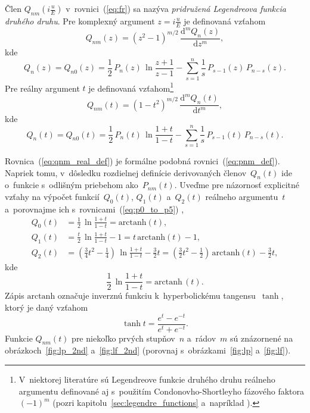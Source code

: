 \documentclass[a4paper, 12pt]{book}
\newcommand{\diff}{\mathrm d}
\begin{document}
Člen $Q_{nm}\left( i \frac{u}{E} \right)$ v~rovnici~(\ref{eq:fr}) sa nazýva 
\emph{pridružená Legendreova funkcia druhého druhu}.  Pre komplexný argument $z 
= i \frac{u}{E}$ je definovaná vzťahom \parencite{MoritzTheFigureOfTheEarth}
%
\begin{equation}
\label{eq:qnm_imag_def}
Q_{nm}(z) = (z^2 - 1)^{m \slash 2} \, \frac{\diff^m Q_n(z)}{\diff z^m}{,}
\end{equation}
%
kde
%
\begin{equation}
\label{eq:qn0_imag_def}
Q_{n}(z) = Q_{n0}(z) = \frac{1}{2} \, P_n(z) \, \ln\frac{z + 1}{z - 1} 
- \sum_{s = 1}^n \frac{1}{s} \, P_{s - 1}(z) \, P_{n - s}(z){.}
\end{equation}
%
Pre reálny argument $t$ je definovaná vzťahom\footnote{V~niektorej literatúre 
sú Legendreove funkcie druhého druhu reálneho argumentu definované aj 
s~použitím Condonovho-Shortleyho fázového faktora $(-1)^m$ (pozri 
kapitolu~\ref{sec:legendre_functions} a~napríklad \cite{Olver2010}).}
\parencite{MoritzPhysicalGeodesy}
%
\begin{equation}
\label{eq:qnm_real_def}
Q_{nm}(t) = (1 - t^2)^{m \slash 2} \, \frac{\diff^m Q_n(t)}{\diff t^m}{,}
\end{equation}
%
kde
%
\begin{equation}
\label{eq:qn0_real_def}
Q_{n}(t) = Q_{n0}(t) = \frac{1}{2} \, P_n(t) \, \ln\frac{1 + t}{1 - t} 
- \sum_{s = 1}^n \frac{1}{s} \, P_{s - 1}(t) \, P_{n - s}(t){.}
\end{equation}

Rovnica~(\ref{eq:qnm_real_def}) je formálne podobná rovnici~(\ref{eq:pnm_def}).  
Napriek tomu, v~dôsledku rozdielnej definície derivovaných členov~$Q_n(t)$ ide 
o~funkcie s~odlišným priebehom ako~$P_{nm}(t)$.  Uveďme pre názornosť 
explicitné vzťahy na výpočet funkcií~$Q_0\left( t \right)$, $Q_1\left( 
t \right)$ a~$Q_2\left( t \right)$ reálneho argumentu~$t$ a~porovnajme ich 
s~rovnicami~(\ref{eq:p0_to_p5})
\parencite{MoritzPhysicalGeodesy},
%
\begin{align}
\label{eq:q0t}
Q_0(t) &= \frac{1}{2} \, \ln\frac{1 + t}{1 - t} = \mathrm{arctanh}(t){,}\\
%
\label{eq:q1t}
Q_1(t) &= \frac{t}{2} \, \ln\frac{1 + t}{1 - t} - 1 = t \, \mathrm{arctanh}(t)- 
 1{,}\\
%
\label{eq:q2t}
Q_2(t) &= \left( \frac{3}{4} t^2 - \frac{1}{4} \right) \, \ln\frac{1 + t}{1 
- t} - \frac{3}{2}t = \left( \frac{3}{2} t^2 - \frac{1}{2} \right) \, 
\mathrm{arctanh}(t) - \frac{3}{2}t{,}
\end{align}
%
kde
%
\begin{equation}
\label{eq:tanh}
\frac{1}{2} \, \ln \frac{1 + t}{1 - t} = \mathrm{arctanh} \, (t){.}
\end{equation}
%
Zápis $\mathrm{arctanh}$ označuje inverznú funkciu k~hyperbolickému 
tangensu~$\tanh$, ktorý je daný vzťahom \parencite{Gradshteyn2007}
%
\begin{equation}
\tanh t = \frac{e^t - e^{-t}}{e^t + e^{-t}}{.}
\end{equation}
%
Funkcie $Q_{nm}(t)$ pre niekoľko prvých stupňov~$n$ a~rádov~$m$ sú znázornené 
na obrázkoch~\ref{fig:lp_2nd} a~\ref{fig:lf_2nd} (porovnaj 
s~obrázkami~\ref{fig:lp} a~\ref{fig:lf}).
\end{document}
